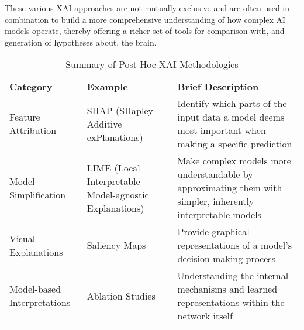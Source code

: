 These various XAI approaches are not mutually exclusive and are often used in combination to build a more comprehensive understanding of how complex AI models operate, thereby offering a richer set of tools for comparison with, and generation of hypotheses about, the brain.

\begin{table}[h!]
    \centering
    \begin{tabular}{|p{}|p{}|p{}|}
        \hline
        \multirow{2}{=}{\textbf{Category}} & \multirow{2}{=}{\textbf{Example}} & \multirow{2}{=}{\textbf{Brief Description}} \\
        & & \\
        \hline
        \multirow{4}{=}{Feature Attribution} & \multirow{4}{=}{SHAP (SHapley Additive exPlanations)} & \multirow{4}{=}{Identify which parts of the input data a model deems most important when making a specific prediction} \\
        & & \\
        & & \\
        & & \\
        \hline
        \multirow{5}{=}{Model Simplification} & \multirow{5}{=}{LIME (Local Interpretable Model-agnostic Explanations)} & \multirow{5}{=}{Make complex models more understandable by approximating them with simpler, inherently interpretable models} \\
        & & \\
        & & \\
        & & \\
        & & \\
        \hline
        \multirow{3}{=}{Visual Explanations} & \multirow{3}{=}{Saliency Maps} & \multirow{3}{=}{Provide graphical representations of a model's decision-making process} \\
        & & \\
        & & \\
        \hline
        \multirow{4}{=}{Model-based Interpretations} & \multirow{4}{=}{Ablation Studies} & \multirow{4}{=}{Understanding the internal mechanisms and learned representations within the network itself} \\
        & & \\
        & & \\
        & & \\
        \hline
    \end{tabular}
    \caption{Summary of Post-Hoc XAI Methodologies}
    \label{tab:xai_taxonomy}
\end{table}

